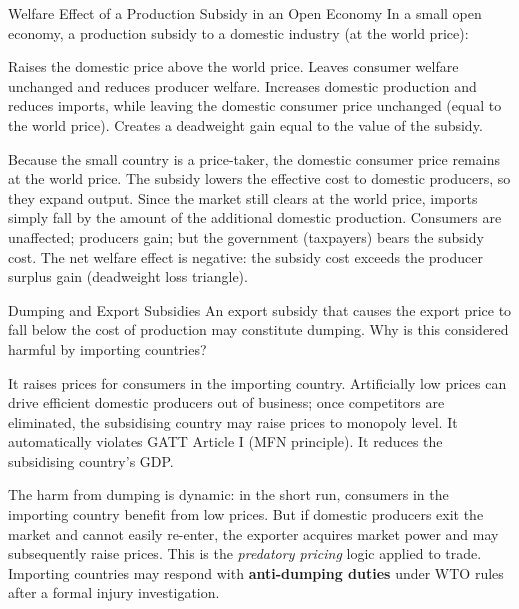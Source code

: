 \documentclass[paper=a5]{scrartcl}
\begin{document}
\begin{question}[type=mc]{Welfare Effect of a Production Subsidy in an Open Economy}
In a small open economy, a production subsidy to a domestic industry
(at the world price):
\begin{choices}
  \choice        Raises the domestic price above the world price.
  \choice        Leaves consumer welfare unchanged and reduces producer
                 welfare.
  \correctchoice Increases domestic production and reduces imports, while
                 leaving the domestic consumer price unchanged (equal to the
                 world price).
  \choice        Creates a deadweight gain equal to the value of the subsidy.
\end{choices}
\begin{solution}
  Because the small country is a price-taker, the domestic consumer price
  remains at the world price. The subsidy lowers the effective cost to
  domestic producers, so they expand output. Since the market still clears
  at the world price, imports simply fall by the amount of the additional
  domestic production. Consumers are unaffected; producers gain; but the
  government (taxpayers) bears the subsidy cost. The net welfare effect is
  negative: the subsidy cost exceeds the producer surplus gain (deadweight
  loss triangle).
\end{solution}
\end{question}

\begin{question}[type=mc]{Dumping and Export Subsidies}
An export subsidy that causes the export price to fall below the cost of
production may constitute dumping. Why is this considered harmful by
importing countries?
\begin{choices}
  \choice        It raises prices for consumers in the importing country.
  \correctchoice Artificially low prices can drive efficient domestic producers
                 out of business; once competitors are eliminated, the
                 subsidising country may raise prices to monopoly level.
  \choice        It automatically violates GATT Article I (MFN principle).
  \choice        It reduces the subsidising country's GDP.
\end{choices}
\begin{solution}
  The harm from dumping is dynamic: in the short run, consumers in the
  importing country benefit from low prices. But if domestic producers exit
  the market and cannot easily re-enter, the exporter acquires market power
  and may subsequently raise prices. This is the \emph{predatory pricing}
  logic applied to trade. Importing countries may respond with
  \textbf{anti-dumping duties} under WTO rules after a formal injury
  investigation.
\end{solution}
\end{question}
\end{document}
